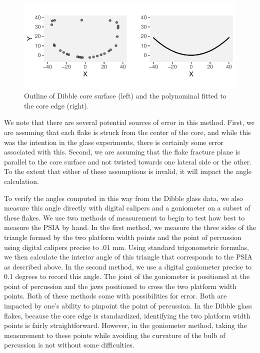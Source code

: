 \documentclass[10pt,letterpaper]{article}
\begin{document}
\begin{figure}
\centering
\includegraphics{PSIA_Manuscript_files/figure-latex/fig1-core_outlines-1.pdf}
\caption{Outline of Dibble core surface (left) and the polynominal
fitted to the core edge (right).}
\end{figure}

We note that there are several potential sources of error in this
method. First, we are assuming that each flake is struck from the center
of the core, and while this was the intention in the glass experiments,
there is certainly some error associated with this. Second, we are
assuming that the flake fracture plane is parallel to the core surface
and not twisted towards one lateral side or the other. To the extent
that either of these assumptions is invalid, it will impact the angle
calculation.

To verify the angles computed in this way from the Dibble glass data, we
also measure this angle directly with digital calipers and a goniometer
on a subset of these flakes. We use two methods of measurement to begin
to test how best to measure the PSIA by hand. In the first method, we
measure the three sides of the triangle formed by the two platform width
points and the point of percussion using digital calipers precise to .01
mm. Using standard trigonometric formulas, we then calculate the
interior angle of this triangle that corresponds to the PSIA as
described above. In the second method, we use a digital goniometer
precise to 0.1 degrees to record this angle. The joint of the goniometer
is positioned at the point of percussion and the jaws positioned to
cross the two platform width points. Both of these methods come with
possibilities for error. Both are impacted by one's ability to pinpoint
the point of percussion. In the Dibble glass flakes, because the core
edge is standardized, identifying the two platform width points is
fairly straightforward. However, in the goniometer method, taking the
measurement to these points while avoiding the curvature of the bulb of
percussion is not without some difficulties.
\end{document}
